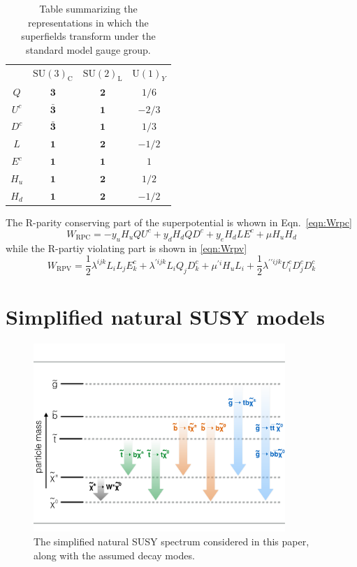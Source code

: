 \begin{table}
\centering
\begin{tabular}{c|ccc}
&$\mathrm{SU(3)}_{\mathrm{C}}$&$\mathrm{SU(2)}_{\mathrm{L}}$&$\mathrm{U(1)}_Y$ \\
$Q$ & $\mathbf{3}$ & $\mathbf{2}$ & $1/6$\\
$U^c$ & $\mathbf{\bar 3}$ & $\mathbf{1}$ & $-2/3$\\
$D^c$ & $\mathbf{\bar 3}$ & $\mathbf{1}$ & $1/3$\\
$L$ & $\mathbf{1}$ & $\mathbf{2}$ & $-1/2$\\
$E^c$ & $\mathbf{1}$ & $\mathbf{1}$ & $1$\\\hline
$H_u$ & $\mathbf{1}$ & $\mathbf{2}$ & $1/2$\\
$H_d$ & $\mathbf{1}$ & $\mathbf{2}$ & $-1/2$
\end{tabular}
\caption{\label{tab:representations} Table summarizing the
    representations in which the superfields transform under the standard
    model gauge group.}
\end{table}

The R-parity conserving part of the superpotential is whown in Eqn.~\ref{eqn:Wrpc}
\begin{equation}
W_{\mathrm{RPC}} = - y_u H_u Q U^c + y_dH_d Q D^c + y_e H_d L E^c +
\mu H_uH_d
\label{eqn:Wrpc}
\end{equation}
while the R-partiy violating part is shown in \ref{eqn:Wrpv}
\begin{equation}
W_{\mathrm{RPV}} =\frac{1}{2}\lambda^{ijk}L_iL_jE_k^c +
\lambda^{\prime ijk} L_iQ_jD_k^c + \mu^{\prime i}H_uL_i +
\frac{1}{2}\lambda^{\prime\prime ijk}U_i^cD_j^cD_k^c
\label{eqn:Wrpv}
\end{equation}

\section{Simplified natural SUSY models}
\label{sec:sms}

\begin{figure}[htb!]
\centering
\includegraphics[width=0.85\textwidth]{figs/analysis8TeV/naturalSpectrum.pdf}
\caption{\label{fig:spectrum} The simplified natural SUSY spectrum
  considered in this paper, along with the assumed decay modes.}
\end{figure}

